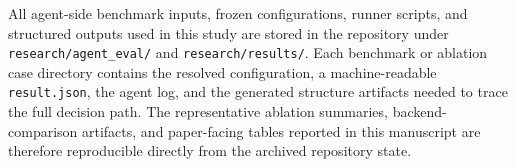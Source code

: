 All agent-side benchmark inputs, frozen configurations, runner scripts, and structured outputs used in this study are stored in the repository under \texttt{research/agent\_eval/} and \texttt{research/results/}. Each benchmark or ablation case directory contains the resolved configuration, a machine-readable \texttt{result.json}, the agent log, and the generated structure artifacts needed to trace the full decision path. The representative ablation summaries, backend-comparison artifacts, and paper-facing tables reported in this manuscript are therefore reproducible directly from the archived repository state.
